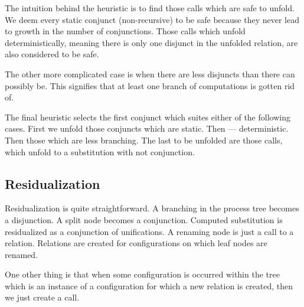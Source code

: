 The intuition behind the heuristic is to find those calls which are safe to unfold.
We deem every static conjunct (non-recursive) to be safe because they never lead to growth in the number of conjunctions.
Those calls which unfold deterministically, meaning there is only one disjunct in the unfolded relation, are also considered to be safe.

The other more complicated case is when there are less disjuncts than there can possibly be.
This signifies that at least one branch of computations is gotten rid of.

The final heuristic selects the first conjunct which suites either of the following cases.
First we unfold those conjuncts which are static.
Then --- deterministic.
Then those which are less branching.
The last to be unfolded are those calls, which unfold to a substitution with not conjunction.

\subsection{Residualization}

Residualization is quite straightforward.
A branching in the process tree becomes a disjunction.
A split node becomes a conjunction.
Computed substitution is residualized as a conjunction of unifications.
A renaming node is just a call to a relation.
Relations are created for configurations on which leaf nodes are renamed.

One other thing is that when some configuration is occurred within the tree which is an instance of a configuration for which a new relation is created, then we just create a call.